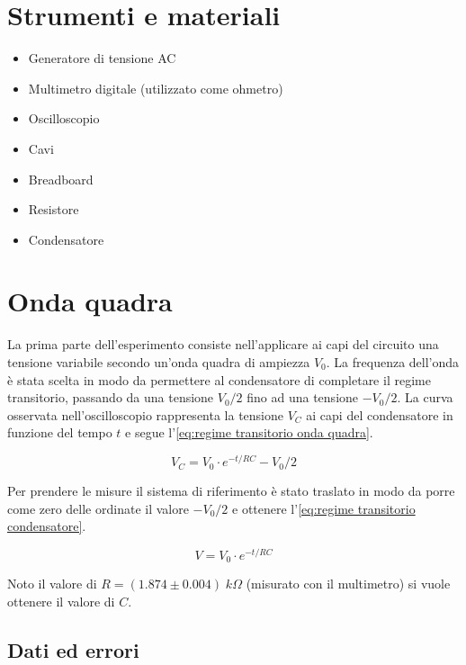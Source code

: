 \documentclass[11pt, a4paper]{article}
\numberwithin{equation}{section} %
\begin{document}
\section{Strumenti e materiali}

\begin{itemize}
    \item Generatore di tensione AC
    \item Multimetro digitale (utilizzato come ohmetro)
    \item Oscilloscopio
    \item Cavi
    \item Breadboard
    \item Resistore
    \item Condensatore
\end{itemize}

\section{Onda quadra} \label{sec:onda quadra}

La prima parte dell'esperimento consiste nell'applicare ai capi del circuito una tensione variabile secondo un'onda quadra di ampiezza \(V_{0}\). La frequenza dell'onda è stata scelta in modo da permettere al condensatore di completare il regime transitorio, passando da una tensione \(V_{0}/2\) fino ad una tensione \(- V_{0}/2\). La curva osservata nell'oscilloscopio rappresenta la tensione \(V_{C}\) ai capi del condensatore in funzione del tempo \(t\) e segue l'\autoref{eq:regime transitorio onda quadra}.

\begin{equation} \label{eq:regime transitorio onda quadra}
    V_{C} = V_{0} \cdot e^{-t/RC} - V_{0}/2
\end{equation}

Per prendere le misure il sistema di riferimento è stato traslato in modo da porre come zero delle ordinate il valore \(- V_{0}/2\) e ottenere l'\autoref{eq:regime transitorio condensatore}.

\begin{equation} \label{eq:regime transitorio condensatore}
    V = V_{0} \cdot e^{-t/RC}
\end{equation}

Noto il valore di \(R = (1.874 \pm 0.004) \; \unit{k\Omega}\) (misurato con il multimetro) si vuole ottenere il valore di \(C\).

\subsection{Dati ed errori}
\end{document}
